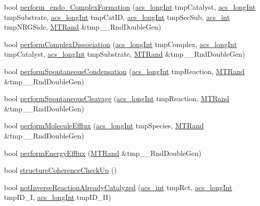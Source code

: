 \begin{DoxyCompactItemize}
\item 
bool \hyperlink{a00014_ae942db2453c56b60250a5d43452b91a5}{perform\-\_\-endo\-\_\-\-Complex\-Formation} (\hyperlink{a00072_a19319d75f02db4308bc5c0026d98cd85}{acs\-\_\-long\-Int} tmp\-Catalyst, \hyperlink{a00072_a19319d75f02db4308bc5c0026d98cd85}{acs\-\_\-long\-Int} tmp\-Substrate, \hyperlink{a00072_a19319d75f02db4308bc5c0026d98cd85}{acs\-\_\-long\-Int} tmp\-Cat\-I\-D, \hyperlink{a00072_a19319d75f02db4308bc5c0026d98cd85}{acs\-\_\-long\-Int} tmp\-Sec\-Sub, \hyperlink{a00072_a8d277355641a098190360234e2ebde35}{acs\-\_\-int} tmp\-N\-R\-G\-Side, \hyperlink{a00016}{M\-T\-Rand} \&tmp\-\_\-\-\_\-\-Rnd\-Double\-Gen)
\item 
bool \hyperlink{a00014_a5c5e57b0558067cbf55c894f33d0a121}{perform\-Complex\-Dissociation} (\hyperlink{a00072_a19319d75f02db4308bc5c0026d98cd85}{acs\-\_\-long\-Int} tmp\-Complex, \hyperlink{a00072_a19319d75f02db4308bc5c0026d98cd85}{acs\-\_\-long\-Int} tmp\-Catalyst, \hyperlink{a00072_a19319d75f02db4308bc5c0026d98cd85}{acs\-\_\-long\-Int} tmp\-Substrate, \hyperlink{a00016}{M\-T\-Rand} \&tmp\-\_\-\-\_\-\-Rnd\-Double\-Gen)
\item 
bool \hyperlink{a00014_acc764a05297ae00db52360f3df5ed1d5}{perform\-Spontaneous\-Condensation} (\hyperlink{a00072_a19319d75f02db4308bc5c0026d98cd85}{acs\-\_\-long\-Int} tmp\-Reaction, \hyperlink{a00016}{M\-T\-Rand} \&tmp\-\_\-\-\_\-\-Rnd\-Double\-Gen)
\item 
bool \hyperlink{a00014_a4949138a3771b7f6ec2bfe82cbad947e}{perform\-Spontaneous\-Cleavage} (\hyperlink{a00072_a19319d75f02db4308bc5c0026d98cd85}{acs\-\_\-long\-Int} tmp\-Reaction, \hyperlink{a00016}{M\-T\-Rand} \&tmp\-\_\-\-\_\-\-Rnd\-Double\-Gen)
\item 
bool \hyperlink{a00014_ad072a40a7d9521379c7ff50ed8110fbe}{perform\-Molecule\-Efflux} (\hyperlink{a00072_a19319d75f02db4308bc5c0026d98cd85}{acs\-\_\-long\-Int} tmp\-Species, \hyperlink{a00016}{M\-T\-Rand} \&tmp\-\_\-\-\_\-\-Rnd\-Double\-Gen)
\item 
bool \hyperlink{a00014_aff7607e0f3a74790109a7d87de3031bd}{perform\-Energy\-Efflux} (\hyperlink{a00016}{M\-T\-Rand} \&tmp\-\_\-\-\_\-\-Rnd\-Double\-Gen)
\item 
bool \hyperlink{a00014_a6606b08f25751a8796c13810962b385e}{structure\-Coherence\-Check\-Up} ()
\item 
bool \hyperlink{a00014_a5160dec152ed0369fe8af9aff3253a9e}{not\-Inverse\-Reaction\-Already\-Catalyzed} (\hyperlink{a00072_a8d277355641a098190360234e2ebde35}{acs\-\_\-int} tmp\-Rct, \hyperlink{a00072_a19319d75f02db4308bc5c0026d98cd85}{acs\-\_\-long\-Int} tmp\-I\-D\-\_\-\-I, \hyperlink{a00072_a19319d75f02db4308bc5c0026d98cd85}{acs\-\_\-long\-Int} tmp\-I\-D\-\_\-\-I\-I)

\end{DoxyCompactItemize}
